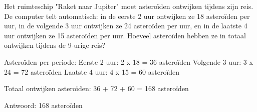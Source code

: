 \begin{opgave}
Het ruimteschip "Raket naar Jupiter" moet asteroïden ontwijken tijdens zijn 
reis. De computer telt automatisch: in de eerste 2 uur ontwijken ze 18 
asteroïden per uur, in de volgende 3 uur ontwijken ze 24 asteroïden per uur, 
en in de laatste 4 uur ontwijken ze 15 asteroïden per uur. Hoeveel asteroïden 
hebben ze in totaal ontwijken tijdens de 9-urige reis?
\end{opgave}

\begin{oplossing}
Asteroïden per periode:
Eerste 2 uur: 2 x 18 = 36 asteroïden
Volgende 3 uur: 3 x 24 = 72 asteroïden
Laatste 4 uur: 4 x 15 = 60 asteroïden

Totaal ontwijken asteroïden:
36 + 72 + 60 = 168 asteroïden

Antwoord: 168 asteroïden
\end{oplossing}